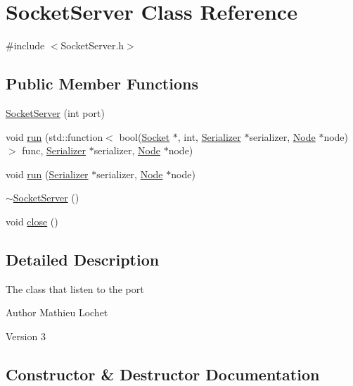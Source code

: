 \hypertarget{classSocketServer}{}\section{Socket\+Server Class Reference}
\label{classSocketServer}


{\ttfamily \#include $<$Socket\+Server.\+h$>$}

\subsection*{Public Member Functions}
\begin{DoxyCompactItemize}
\item 
\mbox{\hyperlink{classSocketServer_a73939197c857f63eede6fc2f0c6ab433}{Socket\+Server}} (int port)
\item 
void \mbox{\hyperlink{classSocketServer_aba550d54be7cb671b850085280b29506}{run}} (std\+::function$<$ bool(\mbox{\hyperlink{classSocket}{Socket}} $\ast$, int, \mbox{\hyperlink{classSerializer}{Serializer}} $\ast$serializer, \mbox{\hyperlink{classNode}{Node}} $\ast$node)$>$ func, \mbox{\hyperlink{classSerializer}{Serializer}} $\ast$serializer, \mbox{\hyperlink{classNode}{Node}} $\ast$node)
\item 
void \mbox{\hyperlink{classSocketServer_aaaa3c5145b286c3d492f9bf1bec5a5dc}{run}} (\mbox{\hyperlink{classSerializer}{Serializer}} $\ast$serializer, \mbox{\hyperlink{classNode}{Node}} $\ast$node)
\item 
\mbox{\hyperlink{classSocketServer_af0e595690e453ef4b8e8da174069aba9}{$\sim$\+Socket\+Server}} ()
\item 
void \mbox{\hyperlink{classSocketServer_a1e673e526a459bdb3ca92e103ec212ae}{close}} ()
\end{DoxyCompactItemize}


\subsection{Detailed Description}
The class that listen to the port

\begin{DoxyAuthor}{Author}
Mathieu Lochet 
\end{DoxyAuthor}
\begin{DoxyVersion}{Version}
3 
\end{DoxyVersion}


\subsection{Constructor \& Destructor Documentation}
\mbox{\label{classSocketServer_a73939197c857f63eede6fc2f0c6ab433}} 
